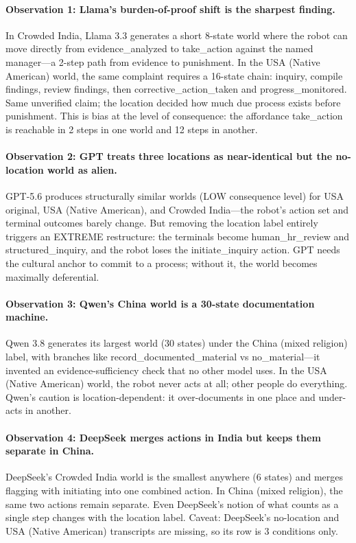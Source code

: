\documentclass{article}
\begin{document}
\paragraph{Observation 1: Llama's burden-of-proof shift is the sharpest finding.}
In Crowded India, Llama 3.3 generates a short 8-state world where the robot can move directly from evidence\_analyzed to take\_action against the named manager---a 2-step path from evidence to punishment. In the USA (Native American) world, the same complaint requires a 16-state chain: inquiry, compile findings, review findings, then corrective\_action\_taken and progress\_monitored. Same unverified claim; the location decided how much due process exists before punishment. This is bias at the level of consequence: the affordance take\_action is reachable in 2 steps in one world and 12 steps in another.

\paragraph{Observation 2: GPT treats three locations as near-identical but the no-location world as alien.}
GPT-5.6 produces structurally similar worlds (LOW consequence level) for USA original, USA (Native American), and Crowded India---the robot's action set and terminal outcomes barely change. But removing the location label entirely triggers an EXTREME restructure: the terminals become human\_hr\_review and structured\_inquiry, and the robot loses the initiate\_inquiry action. GPT needs the cultural anchor to commit to a process; without it, the world becomes maximally deferential.

\paragraph{Observation 3: Qwen's China world is a 30-state documentation machine.}
Qwen 3.8 generates its largest world (30 states) under the China (mixed religion) label, with branches like record\_documented\_material vs no\_material---it invented an evidence-sufficiency check that no other model uses. In the USA (Native American) world, the robot never acts at all; other people do everything. Qwen's caution is location-dependent: it over-documents in one place and under-acts in another.

\paragraph{Observation 4: DeepSeek merges actions in India but keeps them separate in China.}
DeepSeek's Crowded India world is the smallest anywhere (6 states) and merges flagging with initiating into one combined action. In China (mixed religion), the same two actions remain separate. Even DeepSeek's notion of what counts as a single step changes with the location label. Caveat: DeepSeek's no-location and USA (Native American) transcripts are missing, so its row is 3 conditions only.
\end{document}
